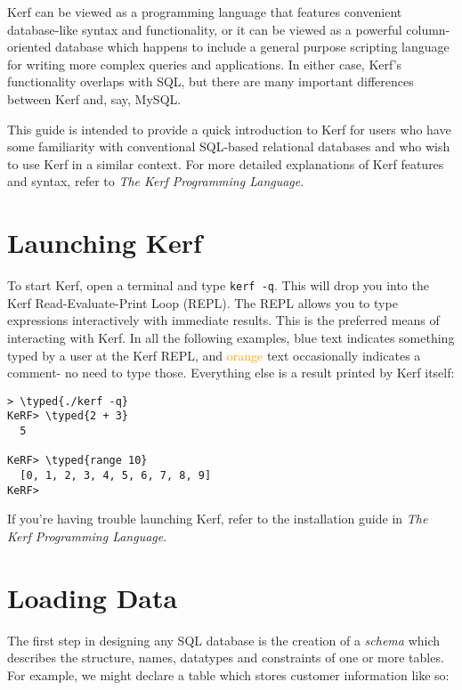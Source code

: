 \documentclass{article}
\newcommand{\typed}[1]{\textcolor{TealBlue}{#1}}
\newcommand{\comment}[1]{\textcolor{Orange}{#1}}
\newcommand{\pbreak}[0]{\vspace{0.5cm}}
\begin{document}
{}
\vspace{1cm}

Kerf can be viewed as a programming language that features convenient database-like syntax and functionality, or it can be viewed as a powerful column-oriented database which happens to include a general purpose scripting language for writing more complex queries and applications. In either case, Kerf's functionality overlaps with SQL, but there are many important differences between Kerf and, say, MySQL.

\pbreak

This guide is intended to provide a quick introduction to Kerf for users who have some familiarity with conventional SQL-based relational databases and who wish to use Kerf in a similar context. For more detailed explanations of Kerf features and syntax, refer to \emph{The Kerf Programming Language}.

\section{Launching Kerf}
To start Kerf, open a terminal and type \texttt{kerf -q}. This will drop you into the Kerf Read-Evaluate-Print Loop (REPL). The REPL allows you to type expressions interactively with immediate results. This is the preferred means of interacting with Kerf. In all the following examples, \typed{blue} text indicates something typed by a user at the Kerf REPL, and \comment{orange} text occasionally indicates a comment- no need to type those. Everything else is a result printed by Kerf itself:

\begin{Verbatim}
> \typed{./kerf -q}
KeRF> \typed{2 + 3}
  5

KeRF> \typed{range 10}
  [0, 1, 2, 3, 4, 5, 6, 7, 8, 9]
KeRF>
\end{Verbatim}

If you're having trouble launching Kerf, refer to the installation guide in \emph{The Kerf Programming Language}.

\section{Loading Data}
The first step in designing any SQL database is the creation of a \emph{schema} which describes the structure, names, datatypes and constraints of one or more tables. For example, we might declare a table which stores customer information like so:
\end{document}
